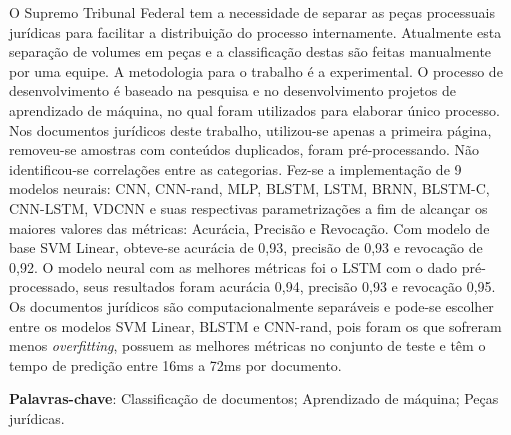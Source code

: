 \begin{resumo}

O Supremo Tribunal Federal tem a necessidade de separar as peças processuais jurídicas para facilitar a distribuição do processo internamente. Atualmente esta separação de volumes em peças e a classificação destas são feitas manualmente por uma equipe. A metodologia para o trabalho é a experimental. O processo de desenvolvimento é baseado na  pesquisa e no desenvolvimento projetos de aprendizado de máquina, no qual foram utilizados para elaborar único processo. Nos documentos jurídicos deste trabalho, utilizou-se apenas a primeira página, removeu-se amostras com conteúdos duplicados, foram pré-processando. Não identificou-se correlações entre as categorias. Fez-se a implementação de 9 modelos neurais: CNN, CNN-rand, MLP, BLSTM, LSTM, BRNN, BLSTM-C, CNN-LSTM, VDCNN e suas respectivas parametrizações a fim de alcançar os maiores valores das métricas: Acurácia, Precisão e Revocação. Com modelo de base SVM Linear, obteve-se acurácia de 0,93, precisão de 0,93 e revocação de 0,92. O modelo neural com as melhores métricas foi o LSTM com o dado pré-processado, seus resultados foram acurácia 0,94, precisão 0,93 e revocação 0,95. Os documentos jurídicos são computacionalmente separáveis e pode-se escolher entre os modelos SVM Linear, BLSTM e CNN-rand, pois foram os que sofreram menos \textit{overfitting}, possuem as melhores métricas no conjunto de teste e têm o tempo de predição entre 16ms a 72ms por documento. 

 \vspace{\onelineskip}
    
 \noindent
 \textbf{Palavras-chave}: Classificação de documentos; Aprendizado de máquina; Peças jurídicas.
\end{resumo}


 
